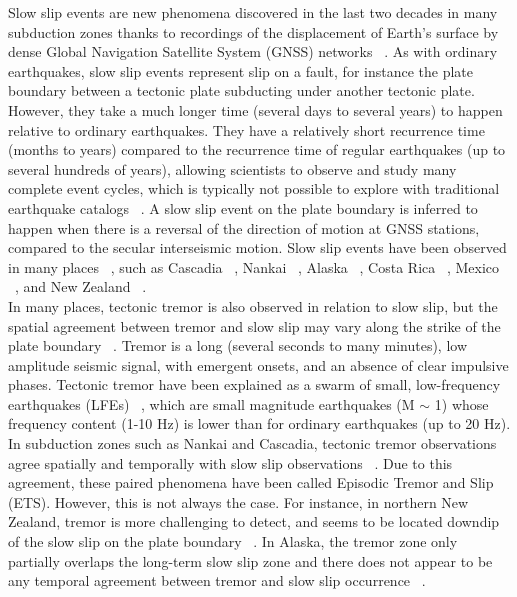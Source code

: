 \documentclass{article}
\begin{document}
Slow slip events are new phenomena discovered in the last two decades in many subduction zones thanks to recordings of the displacement of Earth's surface by dense Global Navigation Satellite System (GNSS) networks ~\citep{VER_2010,SCH_2010,JIA_2012,WAL_2012}. As with ordinary earthquakes, slow slip events represent slip on a fault, for instance the plate boundary between a tectonic plate subducting under another tectonic plate. However, they take a much longer time (several days to several years) to happen relative to ordinary earthquakes. They have a relatively short recurrence time (months to years) compared to the recurrence time of regular earthquakes (up to several hundreds of years), allowing scientists to observe and study many complete event cycles, which is typically not possible to explore with traditional earthquake catalogs ~\citep{BER_2011}. A slow slip event on the plate boundary is inferred to happen when there is a reversal of the direction of motion at GNSS stations, compared to the secular interseismic motion. Slow slip events have been observed in many places ~\citep{BER_2011,AUD_2016}, such as Cascadia ~\citep{BAR_2020}, Nankai ~\citep{NIS_2013}, Alaska ~\citep{LI_2016}, Costa Rica ~\citep{JIA_2012}, Mexico ~\citep{RAD_2012}, and New Zealand ~\citep{WAL_2020}. \\

In many places, tectonic tremor is also observed in relation to slow slip, but the spatial agreement between tremor and slow slip may vary along the strike of the plate boundary ~\citep{HAL_2018}. Tremor is a long (several seconds to many minutes), low amplitude seismic signal, with emergent onsets, and an absence of clear impulsive phases. Tectonic tremor have been explained as a swarm of small, low-frequency earthquakes (LFEs) ~\citep{SHE_2007_nature}, which are small magnitude earthquakes (M $\sim$ 1) whose frequency content (1-10 Hz) is lower than for ordinary earthquakes (up to 20 Hz). In subduction zones such as Nankai and Cascadia, tectonic tremor observations agree spatially and temporally with slow slip observations ~\citep{ROG_2003,OBA_2004}. Due to this agreement, these paired phenomena have been called Episodic Tremor and Slip (ETS). However, this is not always the case. For instance, in northern New Zealand, tremor is more challenging to detect, and seems to be located downdip of the slow slip on the plate boundary ~\citep{TOD_2016}. In Alaska, the tremor zone only partially overlaps the long-term slow slip zone and there does not appear to be any temporal agreement between tremor and slow slip occurrence ~\citep{WEC_2016}. \\
\end{document}
